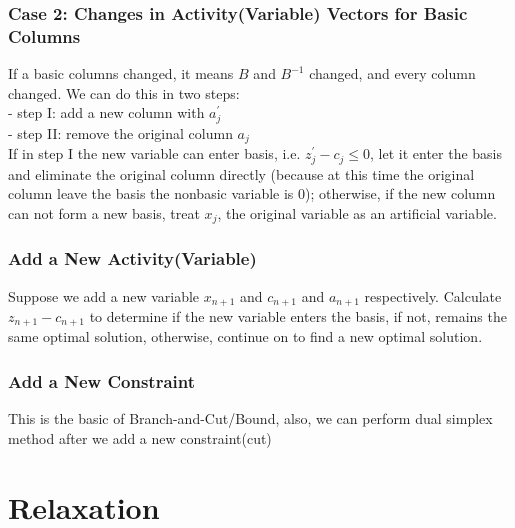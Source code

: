 				\subsubsection{Case 2: Changes in Activity(Variable) Vectors for Basic Columns}
					If a basic columns changed, it means $B$ and $B^{-1}$ changed, and every column changed. We can do this in two steps:\\
					- step I: add a new column with $a_j^{'}$\\
					- step II: remove the original column $a_j$\\
					If in step I the new variable can enter basis, i.e. $z_j^{'} - c_j \le 0$, let it enter the basis and eliminate the original column directly (because at this time the original column leave the basis the nonbasic variable is 0); otherwise, if the new column can not form a new basis, treat $x_j$, the original variable as an artificial variable.

				\subsubsection{Add a New Activity(Variable)}
					Suppose we add a new variable $x_{n+1}$ and $c_{n+1}$ and $a_{n+1}$ respectively. Calculate $z_{n+1} - c_{n+1}$ to determine if the new variable enters the basis, if not, remains the same optimal solution, otherwise, continue on to find a new optimal solution.

				\subsubsection{Add a New Constraint}
					This is the basic of Branch-and-Cut/Bound, also, we can perform dual simplex method after we add a new constraint(cut)\\

		\section{Relaxation}
